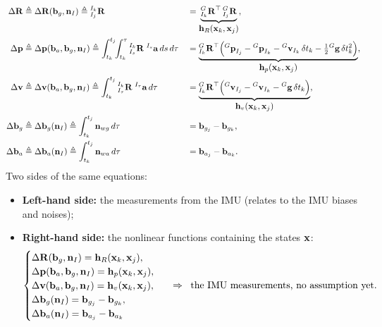\begin{align}
\Delta\vect{R} &\triangleq \Delta\vect{R}(\vect{b}_g, \vect{n}_I)
\triangleq {}^{I_k}_{I_j}\vect{R}
&&= \underbrace{{}^{G}_{I_k}\vect{R}\trans\,{}^{G}_{I_j}\vect{R}}_{\displaystyle \vect{h}_R(\vect{x}_k, \vect{x}_j)}, \\
\Delta\vect{p} &\triangleq \Delta\vect{p}(\vect{b}_a, \vect{b}_g, \vect{n}_I)
\triangleq \int_{t_k}^{t_j}\!\!\int_{t_k}^{\tau} {}^{I_k}_{I_s}\vect{R}\;{}^{I_s}\vect{a}\,ds\,d\tau
&&= \underbrace{{}^{G}_{I_k}\vect{R}\trans\Big({}^{G}\vect{p}_{I_j} - {}^{G}\vect{p}_{I_k} - {}^{G}\vect{v}_{I_k}\,\delta t_k - \tfrac{1}{2}{}^{G}\vect{g}\,\delta t_k^2\Big)}_{\displaystyle \vect{h}_p(\vect{x}_k, \vect{x}_j)}, \\
\Delta\vect{v} &\triangleq \Delta\vect{v}(\vect{b}_a, \vect{b}_g, \vect{n}_I)
\triangleq \int_{t_k}^{t_j} {}^{I_k}_{I_\tau}\vect{R}\;{}^{I_\tau}\vect{a}\,d\tau
&&= \underbrace{{}^{G}_{I_k}\vect{R}\trans\Big({}^{G}\vect{v}_{I_j} - {}^{G}\vect{v}_{I_k} - {}^{G}\vect{g}\,\delta t_k\Big)}_{\displaystyle \vect{h}_v(\vect{x}_k, \vect{x}_j)}, \\
\Delta\vect{b}_g &\triangleq \Delta\vect{b}_g(\vect{n}_I)
\triangleq \int_{t_k}^{t_j} \vect{n}_{wg}\,d\tau
&&= \vect{b}_{g_j} - \vect{b}_{g_k}, \\
\Delta\vect{b}_a &\triangleq \Delta\vect{b}_a(\vect{n}_I)
\triangleq \int_{t_k}^{t_j} \vect{n}_{wa}\,d\tau
&&= \vect{b}_{a_j} - \vect{b}_{a_k}.
\end{align}
Two sides of the same equations:
\begin{itemize}[noitemsep,topsep=2pt]
\item \textbf{Left-hand side:} the measurements from the IMU (relates to the IMU biases and noises);
\item \textbf{Right-hand side:} the nonlinear functions containing the states $\vect{x}$:
\begin{align}
\begin{cases}
\Delta\vect{R}(\vect{b}_g, \vect{n}_I) = \vect{h}_R(\vect{x}_k, \vect{x}_j), \\
\Delta\vect{p}(\vect{b}_a, \vect{b}_g, \vect{n}_I) = \vect{h}_p(\vect{x}_k, \vect{x}_j), \\
\Delta\vect{v}(\vect{b}_a, \vect{b}_g, \vect{n}_I) = \vect{h}_v(\vect{x}_k, \vect{x}_j), \\
\Delta\vect{b}_g(\vect{n}_I) = \vect{b}_{g_j} - \vect{b}_{g_k}, \\
\Delta\vect{b}_a(\vect{n}_I) = \vect{b}_{a_j} - \vect{b}_{a_k}
\end{cases}
\;\;\Rightarrow\;\;
\text{the IMU measurements, no assumption yet.}
\end{align}
\end{itemize}

